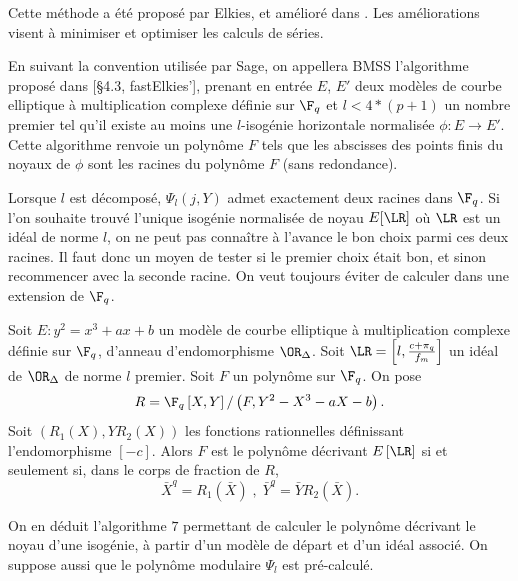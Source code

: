 Cette méthode a été proposé par Elkies, et amélioré dans \cite{Bostan_2008}. Les améliorations visent à minimiser et optimiser les calculs de séries.

\begin{Def}
	En suivant la convention utilisée par Sage, on appellera BMSS l'algorithme proposé dans \cite{Bostan_2008}[\S 4.3, fastElkies'], prenant en entrée $E$, $E'$ deux modèles de courbe elliptique à multiplication complexe définie sur $\F_{q}$ et $l < 4*(p+1)$ un nombre premier tel qu'il existe au moins une $l$-isogénie horizontale normalisée $\phi : E \rightarrow E'$. Cette algorithme renvoie un polynôme $F$ tels que les abscisses des points finis du noyaux de $\phi$ sont les racines du polynôme $F$ (sans redondance).  
\end{Def}

Lorsque $l$ est décomposé, $\Psi_{l}(j,Y)$ admet exactement deux racines dans $\F_{q}$. Si l'on souhaite trouvé l'unique isogénie normalisée de noyau $E[\LR]$ où $\LR$ est un idéal de norme $l$, on ne peut pas connaître à l'avance le bon choix parmi ces deux racines. Il faut donc un moyen de tester si le premier choix était bon, et sinon recommencer avec la seconde racine. On veut toujours éviter de calculer dans une extension de $\F_{q}$.

\begin{Prop}
	Soit $E : y^2 = x^3 + ax + b$ un modèle de courbe elliptique à multiplication complexe définie sur $\F_{q}$, d'anneau d'endomorphisme $\OR_{\Delta}$. Soit $\LR = \left[ l, \frac{c + \pi_{q}}{f_{m}}\right]$ un idéal de $\OR_{\Delta}$ de norme $l$ premier. Soit $F$ un polynôme sur $\F_{q}$.  On pose 
	\begin{equation*}
		R = \F_{q}\left[ X,Y\right] / \left( F, Y^2 - X^3 - aX - b\right).
	\end{equation*}
	Soit $(R_{1}(X), YR_{2}(X))$ les fonctions rationnelles définissant l'endomorphisme $[-c]$. Alors $F$ est le polynôme décrivant $E\left[ \LR\right]$ si et seulement si, dans le corps de fraction de $R$,
	\begin{equation*}
		\bar{X}^q = R_{1}(\bar{X})\;,\;\bar{Y}^{q} = \bar{Y}R_{2}(\bar{X}).
	\end{equation*}
\end{Prop}

On en déduit l'algorithme $7$ permettant de calculer le polynôme décrivant le noyau d'une isogénie, à partir d'un modèle de départ et d'un idéal associé. On suppose aussi que le polynôme modulaire $\Psi_{l}$ est pré-calculé.  

